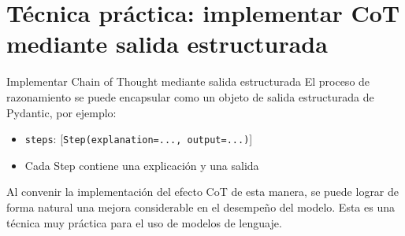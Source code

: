 \section{Técnica práctica: implementar CoT mediante salida estructurada}

\begin{importantbox}{Implementar Chain of Thought mediante salida estructurada}
El proceso de razonamiento se puede encapsular como un objeto de salida estructurada de Pydantic, por ejemplo:
\begin{itemize}
    \item \texttt{steps}: {[}\texttt{Step(explanation=..., output=...)}{]}
    \item Cada Step contiene una explicación y una salida
\end{itemize}
Al convenir la implementación del efecto CoT de esta manera, se puede lograr de forma natural una mejora considerable en el desempeño del modelo. Esta es una técnica muy práctica para el uso de modelos de lenguaje.
\end{importantbox}

